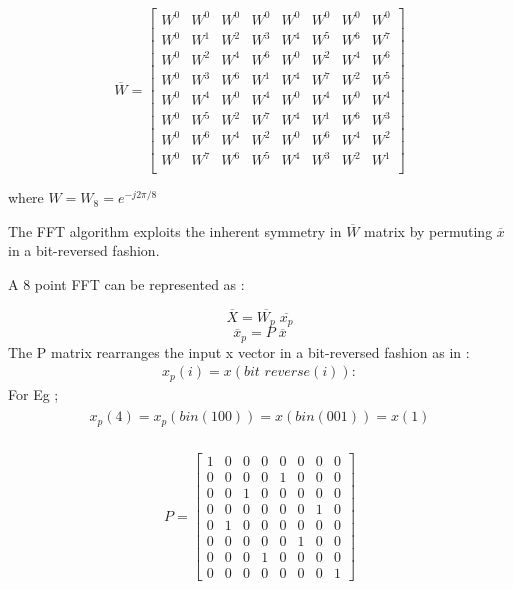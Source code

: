 \documentclass[journal,12pt,twocolumn]{IEEEtran}
\begin{document}
\begin{equation}
\overline{W}
=
\begin{bmatrix}
W^{0} & W^{0} & W^{0} & W^{0} & W^{0} & W^{0} & W^{0} & W^{0} \\
W^{0} & W^{1} & W^{2} & W^{3} & W^{4} & W^{5} & W^{6} & W^{7} \\
W^{0} & W^{2} & W^{4} & W^{6} & W^{0} & W^{2} & W^{4} & W^{6} \\
W^{0} & W^{3} & W^{6} & W^{1} & W^{4} & W^{7} & W^{2} & W^{5} \\
W^{0} & W^{4} & W^{0} & W^{4} & W^{0} & W^{4} & W^{0} & W^{4} \\
W^{0} & W^{5} & W^{2} & W^{7} & W^{4} & W^{1} & W^{6} & W^{3} \\
W^{0} & W^{6} & W^{4} & W^{2} & W^{0} & W^{6} & W^{4} & W^{2} \\
W^{0} & W^{7} & W^{6} & W^{5} & W^{4} & W^{3} & W^{2} & W^{1} \\

\end{bmatrix}
\end{equation}

where $ W = W_{8} = e^{-j2\pi/8}$ \bigskip

The FFT algorithm exploits the inherent symmetry in $\overline{W}$ matrix by permuting $\overline{x}$ in a bit-reversed fashion.

A 8 point FFT can be represented as :

    $$\overline{X} = \overline{W_p}\;  \overline{x_p}$$\newline
    $$\overline{x}_{p} = P \; \overline{x}$$  
The P matrix rearranges the input x vector in a bit-reversed fashion as in : 
\begin{align}
    x_{p}(i) = x(\textit{bit reverse}(i)):
\end{align}
For Eg ; 
\begin{align}
\begin{split}
  x_{p}(4) = x_{p}(bin(100)) = x(bin(001)) = x(1)\\
\end{split}
\end{align}

\begin{equation}
    P = 
    \begin{bmatrix}
1 & 0 & 0 & 0 & 0 & 0 & 0 & 0 \\
0 & 0 & 0 & 0 & 1 & 0 & 0 & 0 \\
0 & 0 & 1 & 0 & 0 & 0 & 0 & 0 \\
0 & 0 & 0 & 0 & 0 & 0 & 1 & 0 \\
0 & 1 & 0 & 0 & 0 & 0 & 0 & 0 \\
0 & 0 & 0 & 0 & 0 & 1 & 0 & 0 \\
0 & 0 & 0 & 1 & 0 & 0 & 0 & 0 \\
0 & 0 & 0 & 0 & 0 & 0 & 0 & 1  

    \end{bmatrix}
\end{equation}
\end{document}
